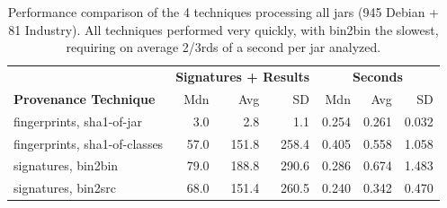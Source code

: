 \begin{table}[h]
  \centering
\begin{tabular}[htbp]{l|rrr|rrr}
                                    & \multicolumn{3}{c|}{\textbf{Signatures + Results}}  & \multicolumn{3}{c}{\textbf{Seconds}} \\
  \textbf{Provenance Technique}     & Mdn   & Avg    & SD    & Mdn  & Avg  & SD  \\
  \hline
  fingerprints, sha1-of-jar         &  3.0  &   2.8  &   1.1 & 0.254  & 0.261  & 0.032   \\
  fingerprints, sha1-of-classes     & 57.0  & 151.8  & 258.4 & 0.405  & 0.558  & 1.058   \\
  signatures, bin2bin               & 79.0  & 188.8  & 290.6 & 0.286  & 0.674  & 1.483   \\
  signatures, bin2src               & 68.0  & 151.4  & 260.5 & 0.240  & 0.342  & 0.470   \\
  \hline
\end{tabular}
  \caption{Performance comparison of the 4 techniques processing all jars
    (945 Debian + 81 Industry).  All techniques
    performed very quickly, with bin2bin the slowest, requiring on average 2/3rds of a second 
    per jar analyzed.}

  \label{tab:perfSummary}
\end{table}




